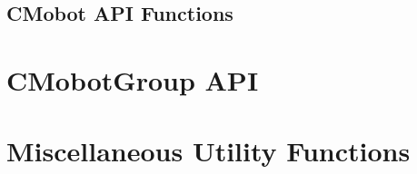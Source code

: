 \documentclass{article}
\begin{document}
\subsection{\label{sec:cmobot_api}CMobot API Functions}


\section{\label{sec:cmobotgroup_api}CMobotGroup API}


\section{\label{sec:utility_functions}Miscellaneous Utility Functions}

\printindex
\end{document}
